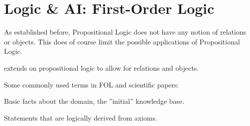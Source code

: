 \documentclass[
../EiKI_Summary.tex,
]
{subfiles}
\begin{document}
\section{Logic \& AI: First-Order Logic}
As established before, Propositional Logic does not have any notion of relations or objects. This does of course limit the possible applications of Propositional Logic.

 extends on propositional logic to allow for relations and objects.

Some commonly used terms in FOL and scientific papers:

\begin{minipage}
    [t]{0.5\textwidth}
    \begin{defbox}
        [Axioms]
        Basic facts about the domain, the ''initial'' knowledge base.
    \end{defbox}
\end{minipage}
\begin{minipage}
    [t]{0.5\textwidth}
    \begin{defbox}
        [Theorems]
        Statements that are logically derived from axioms.
    \end{defbox}
\end{minipage}
\end{document}
